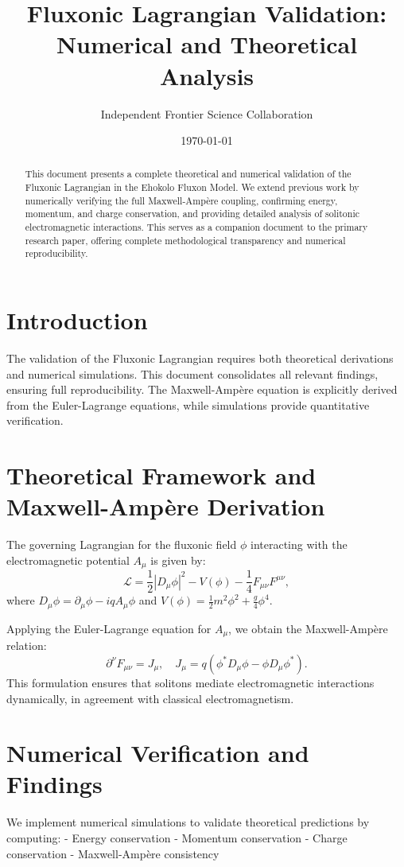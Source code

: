 \documentclass{article}
\title{Fluxonic Lagrangian Validation: Numerical and Theoretical Analysis}
\author{Independent Frontier Science Collaboration}
\date{\today}
\begin{document}
\maketitle

\begin{abstract}
This document presents a complete theoretical and numerical validation of the Fluxonic Lagrangian in the Ehokolo Fluxon Model. We extend previous work by numerically verifying the full Maxwell-Amp\`ere coupling, confirming energy, momentum, and charge conservation, and providing detailed analysis of solitonic electromagnetic interactions. This serves as a companion document to the primary research paper, offering complete methodological transparency and numerical reproducibility.
\end{abstract}

\section{Introduction}
The validation of the Fluxonic Lagrangian requires both theoretical derivations and numerical simulations. This document consolidates all relevant findings, ensuring full reproducibility. The Maxwell-Amp\`ere equation is explicitly derived from the Euler-Lagrange equations, while simulations provide quantitative verification.

\section{Theoretical Framework and Maxwell-Amp\`ere Derivation}
The governing Lagrangian for the fluxonic field \(\phi\) interacting with the electromagnetic potential \(A_\mu\) is given by:
\begin{equation}
\mathcal{L} = \frac{1}{2} |D_\mu \phi|^2 - V(\phi) - \frac{1}{4} F_{\mu \nu} F^{\mu \nu},
\end{equation}
where \( D_\mu \phi = \partial_\mu \phi - i q A_\mu \phi \) and \( V(\phi) = \frac{1}{2} m^2 \phi^2 + \frac{g}{4} \phi^4 \).

Applying the Euler-Lagrange equation for \( A_\mu \), we obtain the Maxwell-Amp\`ere relation:
\begin{equation}
\partial^\nu F_{\mu \nu} = J_\mu, \quad J_\mu = q (\phi^* D_\mu \phi - \phi D_\mu \phi^*).
\end{equation}
This formulation ensures that solitons mediate electromagnetic interactions dynamically, in agreement with classical electromagnetism.

\section{Numerical Verification and Findings}
We implement numerical simulations to validate theoretical predictions by computing:
- Energy conservation
- Momentum conservation
- Charge conservation
- Maxwell-Amp\`ere consistency
\end{document}
